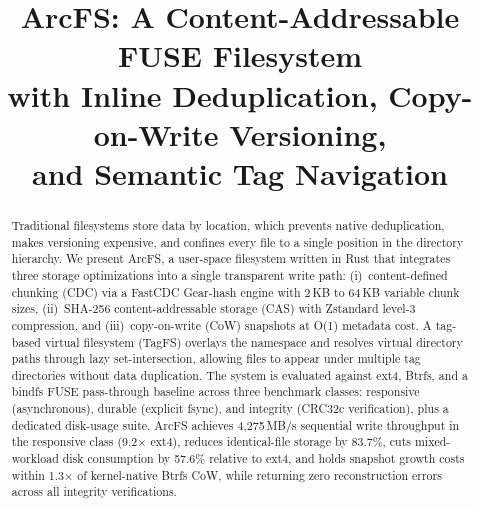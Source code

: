 \documentclass[conference]{IEEEtran}
\begin{document}
\title{ArcFS: A Content-Addressable FUSE Filesystem\\
with Inline Deduplication, Copy-on-Write Versioning,\\
and Semantic Tag Navigation}

\author{
\and
{}
}

\maketitle

\begin{abstract}
Traditional filesystems store data by location, which prevents native
deduplication, makes versioning expensive, and confines every file to a
single position in the directory hierarchy.
We present ArcFS, a user-space filesystem written in Rust that integrates
three storage optimizations into a single transparent write path:
(i)~content-defined chunking (CDC) via a FastCDC Gear-hash engine with
2\,KB to 64\,KB variable chunk sizes,
(ii)~SHA-256 content-addressable storage (CAS) with Zstandard
level-3 compression, and
(iii)~copy-on-write (CoW) snapshots at O(1) metadata cost.
A tag-based virtual filesystem (TagFS) overlays the namespace and resolves
virtual directory paths through lazy set-intersection, allowing files to
appear under multiple tag directories without data duplication.
The system is evaluated against ext4, Btrfs, and a bindfs
FUSE pass-through baseline across three benchmark classes: responsive
(asynchronous), durable (explicit fsync), and integrity
(CRC32c verification), plus a dedicated disk-usage suite.
ArcFS achieves 4{,}275\,MB/s sequential write throughput in the responsive
class (9.2$\times$ ext4), reduces identical-file storage by 83.7\%,
cuts mixed-workload disk consumption by 57.6\% relative to ext4, and
holds snapshot growth costs within 1.3$\times$ of kernel-native Btrfs
CoW, while returning zero reconstruction errors across all integrity
verifications.
\end{abstract}
\end{document}
